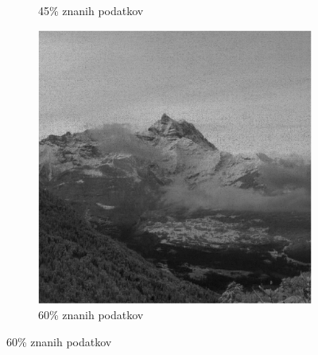 \documentclass{beamer}
\begin{document}
\begin{frame}
\begin{figure}
\begin{subfigure}{0.325\linewidth}
      \caption{45\% znanih podatkov}
    \end{subfigure}
    \begin{subfigure}{0.325\linewidth}
      \includegraphics[width=\linewidth]{slike/gora/slikaRez60SVT.png}
      \caption{60\% znanih podatkov}
    \end{subfigure}
  \end{figure}
\end{frame}
\end{document}
